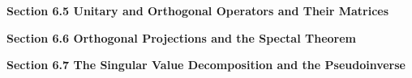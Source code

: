 \documentclass[11pt,largemargins]{homework}
\begin{document}
\question

\question

\question

\question

\question

\question

\question

\question

\question

\textbf{\large{Section 6.5} Unitary and Orthogonal Operators and Their Matrices}
\setcounter{questionCounter}{0}
\question

\question

\question

\question

\question

\question

\question

\question

\question

\question

\textbf{\large{Section 6.6} Orthogonal Projections and the Spectal Theorem}
\setcounter{questionCounter}{0}
\question

\question

\question

\question

\question

\question

\question

\question

\question

\question

\textbf{\large{Section 6.7} The Singular Value Decomposition and the Pseudoinverse}
\setcounter{questionCounter}{0}
\question

\question

\question

\question

\question

\question
\end{document}

